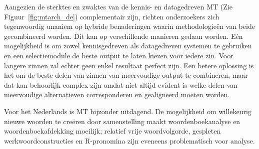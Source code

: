 \documentclass[]{../../metanetpaper}
\begin{document}
\begin{multicols}{2}
    Aangezien de sterktes en zwaktes van de kennis- en datagedreven MT (Zie Figuur~\ref{fig:mtarch_de}) complementair zijn, richten onderzoekers zich tegenwoordig unaniem op hybride benaderingen waarin methodologie{\"e}n van beide gecombineerd worden. Dit kan op verschillende manieren gedaan worden. E{\'e}n mogelijkheid is om zowel kennisgedreven als datagedreven systemen te gebruiken en een selectiemodule de beste output te laten kiezen voor iedere zin. Voor langere zinnen zal echter geen enkel resultaat perfect zijn. Een betere oplossing is het om de beste delen van zinnen van meervoudige output te combineren, maar dat kan behoorlijk complex zijn omdat niet altijd evident is welke delen van meervoudige alternatieven corresponderen en gealigneerd moeten worden.


Voor het Nederlands is MT bijzonder uitdagend. De mogelijkheid om willekeurig nieuwe woorden te cre{\"e}ren door samenstelling maakt woordenboekanalyse en woordenboekafdekking moeilijk; relatief vrije woordvolgorde, gespleten werkwoordconstructies en R-pronomina zijn eveneens problematisch voor analyse.


\end{multicols}
\end{document}
